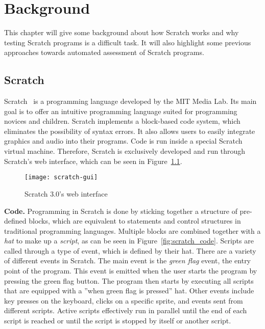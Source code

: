 \chapter{Background}%
\label{cha:background}

This chapter will give some background about how Scratch works and why testing Scratch programs is a difficult task.
It will also highlight some previous approaches towards automated assessment of Scratch programs.

\section{Scratch}%
\label{sec:scratch}

Scratch~\cite{scratch} is a programming language developed by the MIT Media Lab.
Its main goal is to offer an intuitive programming language suited for programming novices and children.
Scratch implements a block-based code system, which eliminates the possibility of syntax errors.
It also allows users to easily integrate graphics and audio into their programs.
Code is run inside a special Scratch virtual machine.
Therefore, Scratch is exclusively developed and run through Scratch's web interface, which can be seen in Figure~\ref{fig:scratch_gui}.
\parspace

\begin{figure}[htpb]
    \centering
    \texttt{[image: scratch-gui]}
    \caption{Scratch 3.0's web interface}
    \label{fig:scratch_gui}
\end{figure}

\textbf{Code.}
Programming in Scratch is done by sticking together a structure of pre-defined blocks, which are equivalent to statements and control
structures in traditional programming languages.
Multiple blocks are combined together with a \textit{hat} to make up a \textit{script}, as can be seen in Figure~\ref{fig:scratch_code}.
Scripts are called through a type of event, which is defined by their hat.
There are a variety of different events in Scratch.
The main event is the \textit{green flag} event, the entry point of the program.
This event is emitted when the user starts the program by pressing the green flag button.
The program then starts by executing all scripts that are equipped with a ''when green flag is pressed'' hat.
Other events include key presses on the keyboard, clicks on a specific sprite, and events sent from different scripts.
Active scripts effectively run in parallel until the end of each script is reached or until the script is stopped by itself or another script.
\parspace

